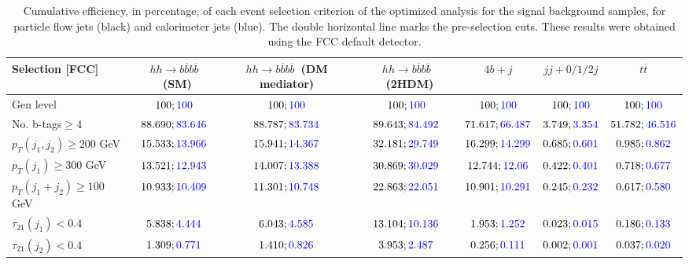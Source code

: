 \begin{landscape}
		\begin{table}
			\centering
			\caption{Cumulative efficiency, in percentage, of each event selection criterion of the optimized analysis for the signal background samples, for particle flow jets (black) and calorimeter jets (blue). The double horizontal line marks the pre-selection cuts. These results were obtained using the FCC default detector.}
			\begin{tabular}{lcccccc}
				\toprule 
				\textbf{Selection [FCC]} & $hh\rightarrow b\overline{b}b\overline{b}$~(SM) & $hh\rightarrow b\overline{b}b\overline{b}$~(DM mediator) & $hh\rightarrow b\overline{b}b\overline{b}$~(2HDM) & $4b+j$  & $jj+0/1/2 j$ & $t\overline{t}$ \\
				\midrule
				Gen level & $100;\textcolor{blue}{100}$ & $100;\textcolor{blue}{100}$ &$100;\textcolor{blue}{100}$& $100;\textcolor{blue}{100}$& $100;\textcolor{blue}{100}$& $100;\textcolor{blue}{100}$ \\
				\rowcolor{black!7}No. b-tags$\geq 4$&$88.690;\textcolor{blue}{83.646}$&$88.787;\textcolor{blue}{83.734}$&$89.643;\textcolor{blue}{84.492}$&$71.617;\textcolor{blue}{66.487}$&$3.749;\textcolor{blue}{3.354}$&$51.782;\textcolor{blue}{46.516}$\\
				$p_T(j_1,j_2)\geq200$ GeV & $15.533;\textcolor{blue}{13.966}$ & $15.941;\textcolor{blue}{14.367}$&$32.181;\textcolor{blue}{29.749}$ &$16.299;\textcolor{blue}{14.299}$&$0.685;\textcolor{blue}{0.601}$&$0.985;\textcolor{blue}{0.862}$\\ 
				\midrule \midrule
				\rowcolor{black!7}$p_T(j_1)\geq 300$ GeV & $13.521;\textcolor{blue}{12.943}$ &$14.007;\textcolor{blue}{13.388}$  &$30.869;\textcolor{blue}{30.029}$&$12.744;\textcolor{blue}{12.06}$&$0.422;\textcolor{blue}{0.401}$&$0.718;\textcolor{blue}{0.677}$\\ 
				$p_T(j_1+j_2)\geq 100$ GeV &$10.933;\textcolor{blue}{10.409}$ & $11.301;\textcolor{blue}{10.748}$ &$22.863;\textcolor{blue}{22.051}$&$10.901;\textcolor{blue}{10.291}$&$0.245;\textcolor{blue}{0.232}$&$0.617;\textcolor{blue}{0.580}$\\
				\rowcolor{black!7}$\tau_{21}(j_1)<0.4$ & $5.838;\textcolor{blue}{4.444}$& $6.043;\textcolor{blue}{4.585}$&$13.104;\textcolor{blue}{10.136}$&$1.953;\textcolor{blue}{1.252}$&$0.023;\textcolor{blue}{0.015}$&$0.186;\textcolor{blue}{0.133}$\\
				$\tau_{21}(j_2)<0.4$ &$1.309;\textcolor{blue}{0.771}$ &$1.410;\textcolor{blue}{0.826}$ &$3.953;\textcolor{blue}{2.487}$&$0.256;\textcolor{blue}{0.111}$&$0.002;\textcolor{blue}{0.001}$&$0.037;\textcolor{blue}{0.020}$\\

\end{tabular}
\end{table}
\end{landscape}
